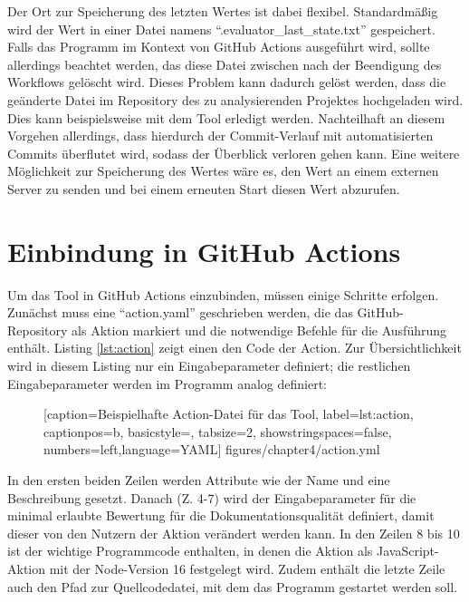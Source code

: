 Der Ort zur Speicherung des letzten Wertes ist dabei flexibel. Standardmäßig wird der Wert in einer Datei namens \enquote{.evaluator\_last\_state.txt} gespeichert. Falls das Programm im Kontext von GitHub Actions ausgeführt wird, sollte allerdings beachtet werden, das diese Datei zwischen nach der Beendigung des Workflows gelöscht wird. Dieses Problem kann dadurch gelöst werden, dass die geänderte Datei im Repository des zu analysierenden Projektes hochgeladen wird. Dies kann beispielsweise mit dem Tool \cite{add_commit} erledigt werden. Nachteilhaft an diesem Vorgehen allerdings, dass hierdurch der Commit-Verlauf mit automatisierten Commits überflutet wird, sodass der Überblick verloren gehen kann.  Eine weitere Möglichkeit zur Speicherung des Wertes wäre es, den Wert an einem externen Server zu senden und bei einem erneuten Start diesen Wert abzurufen. 

  
\section{Einbindung in GitHub Actions}\label{chapter:github_actions_impl}
Um das Tool in GitHub Actions einzubinden, müssen einige Schritte erfolgen. Zunächst muss eine \enquote{action.yaml} geschrieben werden, die das GitHub-Repository als Aktion markiert und die notwendige Befehle für die Ausführung enthält. Listing  \ref{lst:action} zeigt einen den Code der Action. Zur Übersichtlichkeit wird in diesem Listing nur ein Eingabeparameter definiert; die restlichen Eingabeparameter werden im Programm analog definiert:
\begin{figure} [htbp]

[caption={Beispielhafte Action-Datei für das Tool},
label={lst:action},
captionpos=b, basicstyle=\footnotesize, tabsize=2, showstringspaces=false,  numbers=left,language=YAML]
{figures/chapter4/action.yml}
\end{figure}

In den ersten beiden Zeilen werden Attribute wie der Name und eine Beschreibung gesetzt. Danach (Z. 4-7) wird der Eingabeparameter für die minimal erlaubte Bewertung für die Dokumentationsqualität definiert, damit dieser von den Nutzern der Aktion verändert werden kann. In den Zeilen 8 bis 10 ist der wichtige Programmcode enthalten, in denen die Aktion als JavaScript-Aktion mit der Node-Version 16 festgelegt wird. Zudem enthält die letzte Zeile auch den Pfad zur Quellcodedatei, mit dem das Programm gestartet werden soll. 

